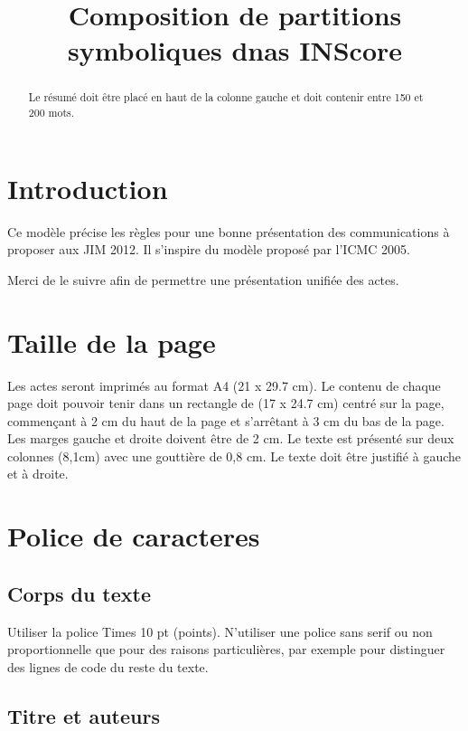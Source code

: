 \documentclass{article}
\title{Composition de partitions symboliques dnas INScore}
\begin{document}
%
\maketitle
%
\begin{abstract}
Le résumé doit être placé en haut de la colonne gauche et doit contenir entre 150 et 200 mots.
\end{abstract}
%
\section{Introduction}\label{sec:introduction}

Ce modèle précise les règles pour une bonne présentation des communications à proposer aux JIM 2012. Il s'inspire du modèle proposé par l'ICMC 2005.

Merci de le suivre afin de permettre une présentation unifiée des actes. 


\section{Taille de la page}\label{sec:page_size}

Les actes seront imprimés au format A4 (21 x 29.7 cm). Le contenu de chaque page doit pouvoir tenir dans un rectangle de (17 x 24.7 cm) centré sur la page, commençant à 2 cm du haut de la page et s'arrêtant à  3 cm du bas de la page. Les marges gauche et droite doivent être de 2 cm. Le texte est présenté sur deux colonnes (8,1cm) avec une gouttière  de 0,8 cm. Le texte doit être justifié à gauche et à droite.

\section{Police de caracteres}\label{sec:typeset_text}

\subsection{Corps du texte}\label{subsec:body}

Utiliser la police Times 10 pt (points). N'utiliser une police sans serif ou non proportionnelle que pour des raisons particulières, par exemple pour distinguer des lignes de code du reste du texte.

\subsection{Titre et auteurs}
\end{document}
